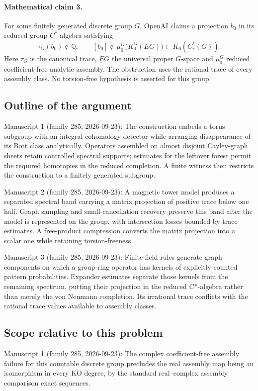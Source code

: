 \documentclass[11pt]{article}
\begin{document}
\paragraph{Mathematical claim 3.} For some finitely generated discrete group $G$, OpenAI claims a projection $b_0$ in its reduced group $C^*$-algebra satisfying
\[
\tau_G(b_0)\notin\mathbb Q,\qquad
[b_0]\notin\mu_0^G\bigl(K_0^G(\underline EG)\bigr)\subset K_0(C_r^*(G)).
\]
Here $\tau_G$ is the canonical trace, $\underline EG$ the universal proper $G$-space and $\mu_0^G$ reduced coefficient-free analytic assembly. The obstruction uses the rational trace of every assembly class. No torsion-free hypothesis is asserted for this group.

\subsection{Outline of the argument}
Manuscript 1 (family 285, 2026-09-23): The construction embeds a torus subgroup with an integral cohomology detector while arranging disappearance of its Bott class analytically. Operators assembled on almost disjoint Cayley-graph sheets retain controlled spectral supports; estimates for the leftover forest permit the required homotopies in the reduced completion. A finite witness then restricts the construction to a finitely generated subgroup.

Manuscript 2 (family 285, 2026-09-23): A magnetic tower model produces a separated spectral band carrying a matrix projection of positive trace below one half. Graph sampling and small-cancellation recovery preserve this band after the model is represented on the group, with intersection losses bounded by trace estimates. A free-product compression converts the matrix projection into a scalar one while retaining torsion-freeness.

Manuscript 3 (family 285, 2026-09-23): Finite-field rules generate graph components on which a group-ring operator has kernels of explicitly counted pattern probabilities. Expander estimates separate those kernels from the remaining spectrum, putting their projection in the reduced C*-algebra rather than merely the von Neumann completion. Its irrational trace conflicts with the rational trace values available to assembly classes.

\subsection{Scope relative to this problem}
Manuscript 1 (family 285, 2026-09-23): The complex coefficient-free assembly failure for this countable discrete group precludes the real assembly map being an isomorphism in every KO degree, by the standard real–complex assembly comparison exact sequences.
\end{document}
